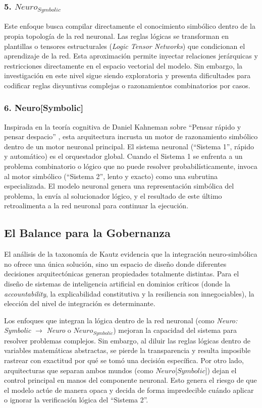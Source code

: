 \documentclass[12pt,a4paper]{report}
\begin{document}
\subsubsection{5. $Neuro_{Symbolic}$}
Este enfoque busca compilar directamente el conocimiento simbólico dentro de la propia topología de la red neuronal. Las reglas lógicas se transforman en plantillas o tensores estructurales (\textit{Logic Tensor Networks}) que condicionan el aprendizaje de la red. Esta aproximación permite inyectar relaciones jerárquicas y restricciones directamente en el espacio vectorial del modelo. Sin embargo, la investigación en este nivel sigue siendo exploratoria y presenta dificultades para codificar reglas disyuntivas complejas o razonamientos combinatorios por casos.

\subsubsection{6. Neuro[Symbolic]}
Inspirada en la teoría cognitiva de Daniel Kahneman sobre ``Pensar rápido y pensar despacio'' \cite{kahneman2011thinking}, esta arquitectura incrusta un motor de razonamiento simbólico dentro de un motor neuronal principal. El sistema neuronal (``Sistema 1'', rápido y automático) es el orquestador global. Cuando el Sistema 1 se enfrenta a un problema combinatorio o lógico que no puede resolver probabilísticamente, invoca al motor simbólico (``Sistema 2'', lento y exacto) como una subrutina especializada. El modelo neuronal genera una representación simbólica del problema, la envía al solucionador lógico, y el resultado de este último retroalimenta a la red neuronal para continuar la ejecución.

\subsection{El Balance para la Gobernanza}

El análisis de la taxonomía de Kautz evidencia que la integración neuro-simbólica no ofrece una única solución, sino un espacio de diseño donde diferentes decisiones arquitectónicas generan propiedades totalmente distintas. Para el diseño de sistemas de inteligencia artificial en dominios críticos (donde la \textit{accountability}, la explicabilidad constitutiva y la resiliencia son innegociables), la elección del nivel de integración es determinante.

Los enfoques que integran la lógica dentro de la red neuronal (como \textit{Neuro: Symbolic} $\rightarrow$ \textit{Neuro} o $\mathit{Neuro}_{\mathit{Symbolic}}$) mejoran la capacidad del sistema para resolver problemas complejos. Sin embargo, al diluir las reglas lógicas dentro de variables matemáticas abstractas, se pierde la transparencia y resulta imposible rastrear con exactitud por qué se tomó una decisión específica. Por otro lado, arquitecturas que separan ambos mundos (como $\textit{Neuro[Symbolic]}$) dejan el control principal en manos del componente neuronal. Esto genera el riesgo de que el modelo actúe de manera opaca y decida de forma impredecible cuándo aplicar o ignorar la verificación lógica del ``Sistema 2''.
\end{document}
